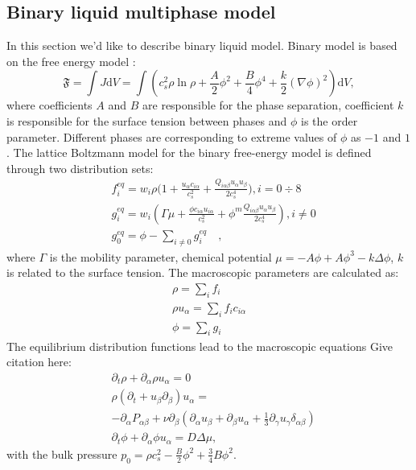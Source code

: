 \documentclass[mathpazo,sort,numbers]{cicp}
\begin{document}
\subsection{Binary liquid multiphase model}
In this section we'd like to describe binary liquid model. Binary model is based on the free energy model \cite{swift,landau}:
\begin{equation}
\mathfrak{F}=\int{J \mathrm{d}V}=\int{\left(c_s^2\rho\ln\rho+\frac{A}{2}\phi^2+\frac{B}{4}\phi^4 + \frac{k}{2}(\nabla \phi)^2 \right)\mathrm{d}V},
\end{equation}
where coefficients $A$ and $B$ are responsible for the phase separation, coefficient $k$ is responsible for the surface tension between phases and $\phi$ is the order parameter. Different phases are corresponding to extreme values of $\phi$ as $-1$ and $1$.
The lattice Boltzmann model for the binary free-energy model is defined through two distribution sets:
\begin{equation}
\begin{aligned}
&f_i^{eq}=w_i \rho \biggl(1+\frac{u_{\alpha}c_{i\alpha}}{c_s^2}+\frac{Q_{i\alpha\beta}u_{\alpha}u_{\beta}}{2 c_s^4}\biggr), i=0\div8\\
&g_i^{eq}=w_i(\Gamma \mu + \frac{\phi c_{i\alpha} u_{i\alpha}}{c_s^2}+\phi^m \frac{Q_{i\alpha\beta}u_{\alpha}u_{\beta}}{2 c_s^4}), i\neq0 \\
&g_0^{eq}=\phi-\sum_{i\neq0}{g_i^{eq}}\quad,
\end{aligned}
\end{equation}
where $\Gamma$ is the mobility parameter, chemical potential $\mu=-A\phi+A\phi^3-k\Delta\phi$, $k$ is related to the surface tension. The macroscopic parameters are calculated as:
\begin{equation}
\begin{aligned}
\rho=\sum_i{f_i}\\
\rho u_{\alpha}=\sum_i{f_i c_{i\alpha}}\\
\phi=\sum_i{g_i}
\end{aligned}
\end{equation}
The equilibrium distribution functions lead to the macroscopic equations {\color{red} Give citation here}:
\begin{equation}
\begin{aligned}
&\partial_t \rho+ \partial_{\alpha} \rho u_{\alpha}=0\\
&\rho\left(\partial_t+u_{\beta}\partial_{\beta}\right) u_{\alpha}=\\
&-\partial_{\alpha}P_{\alpha \beta} + \nu\partial_{\beta}\left(\partial_{\alpha}u_{\beta}+\partial_{\beta} u_{\alpha} + \frac{1}{3}\partial_{\gamma} u_{\gamma} \delta_{\alpha\beta}\right)\\
&\partial_t \phi + \partial_{\alpha} \phi u_{\alpha}=D\Delta \mu,
\end{aligned}
\label{binary:fluid:system}
\end{equation}
with the bulk pressure $p_0=\rho c_s^2-\frac{B}{2}\phi^2+\frac{3}{4}B \phi^2$.
\end{document}
